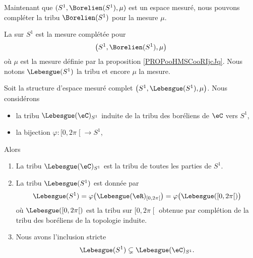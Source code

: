Maintenant que \( (S^1,\Borelien(S^1), \mu)\) est un espace mesuré, nous pouvons compléter la tribu \( \Borelien(S^1)\) pour la mesure \( \mu\).

\begin{definition}
	La  sur \( S^1\) est la mesure complétée pour
	\begin{equation}
		\big( S^1,\Borelien(S^1),\mu \big)
	\end{equation}
	où \( \mu\) est la mesure définie par la proposition \ref{PROPooHMSCooRIjcJq}. Nous notons \( \Lebesgue(S^1)\) la tribu et encore \( \mu\) la mesure.
\end{definition}

\begin{proposition}     \label{PROPooDLBCooUfQZOa}
	Soit la structure d'espace mesuré complet \( \big( S^1,\Lebesgue(S^1), \mu \big)\). Nous considérons
	\begin{itemize}
		\item la tribu \( \Lebesgue(\eC)_{S^1}\) induite de la tribu des boréliens  de \( \eC\) vers \( S^1\),
		\item la bijection \( \varphi\colon \mathopen[ 0 , 2\pi \mathclose[\to S^1\),
	\end{itemize}
	Alors
	\begin{enumerate}
		\item       \label{ITEMooQMHDooHEThPf}
		      La tribu \( \Lebesgue(\eC)_{S^1}\) est la tribu de toutes les parties de \( S^1\).
		\item       \label{ITEMooNIRNooKSeyCa}
		      La tribu \( \Lebesgue(S^1)\) est donnée par
		      \begin{equation}
			      \Lebesgue(S^1)=\varphi\big( \Lebesgue(\eR)_{\mathopen[ 0 , 2\pi \mathclose[} \big)=\varphi\big( \Lebesgue(\mathopen[ 0 , 2\pi \mathclose[) \big)
		      \end{equation}
		      où \( \Lebesgue(\mathopen[ 0 , 2\pi \mathclose[)\) est la tribu sur \( \mathopen[ 0 , 2\pi \mathclose[\) obtenue par complétion de la tribu des boréliens de la topologie induite.
		\item       \label{ITEMooXDBTooYnauyi}
		      Nous avons l'inclusion stricte
		      \begin{equation}
			      \Lebesgue(S^1)\subsetneq\Lebesgue(\eC)_{S^1}.
		      \end{equation}
	\end{enumerate}
\end{proposition}

